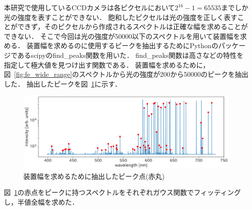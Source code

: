 本研究で使用しているCCDカメラは各ピクセルにおいて$2^{16}-1=65535$までしか光の強度を表すことができない．
飽和したピクセルは光の強度を正しく表すことができず，そのピクセルから作成されるスペクトルは正確な幅を求めることができない．
そこで今回は光の強度が50000以下のスペクトルを用いて装置幅を求める．
装置幅を求めるのに使用するピークを抽出するためにPythonのパッケージであるscipyのfind\_peaks関数\cite{scipy}を用いた．
find\_peaks関数は高さなどの特性を指定して極大値を見つけ出す関数である．
装置幅を求めるために，図\ \ref{fig:fe_wide_range}のスペクトルから光の強度が200から50000のピークを抽出した．
抽出したピークを図\ \ref{fig:fe_wide_range_peak}に示す．
\begin{figure}[htbp]
    \centering
    \includegraphics[scale=0.5]{figure/fe_wide_range_peak.pdf}
    \caption{装置幅を求めるために抽出したピーク点(赤丸)}
    \label{fig:fe_wide_range_peak}
\end{figure}
図\ \ref{fig:fe_wide_range_peak}の赤点をピークに持つスペクトルをそれぞれガウス関数でフィッティングし，半値全幅を求めた．

